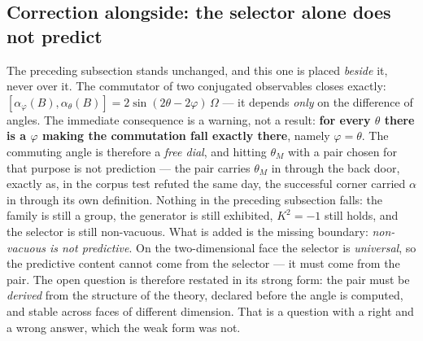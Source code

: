 \documentclass[11pt]{article}
\theoremstyle{definition}\newtheorem{deriv}{Derivation}
\begin{document}
\subsection*{Correction alongside: the selector alone does not predict}The preceding subsection stands unchanged, and this one is placed \emph{beside} it, never over it. The commutator of two conjugated observables closes exactly: $[\alpha_\varphi(B),\alpha_\theta(B)] = 2\sin(2\theta-2\varphi)\,\Omega$ --- it depends \emph{only} on the difference of angles. The immediate consequence is a warning, not a result: \textbf{for every $\theta$ there is a $\varphi$ making the commutation fall exactly there}, namely $\varphi=\theta$. The commuting angle is therefore a \emph{free dial}, and hitting $\theta_M$ with a pair chosen for that purpose is not prediction --- the pair carries $\theta_M$ in through the back door, exactly as, in the corpus test refuted the same day, the successful corner carried $\alpha$ in through its own definition. Nothing in the preceding subsection falls: the family is still a group, the generator is still exhibited, $K^2=-1$ still holds, and the selector is still non-vacuous. What is added is the missing boundary: \emph{non-vacuous is not predictive}. On the two-dimensional face the selector is \emph{universal}, so the predictive content cannot come from the selector --- it must come from the pair. The open question is therefore restated in its strong form: the pair must be \emph{derived} from the structure of the theory, declared before the angle is computed, and stable across faces of different dimension. That is a question with a right and a wrong answer, which the weak form was not.
\end{document}
